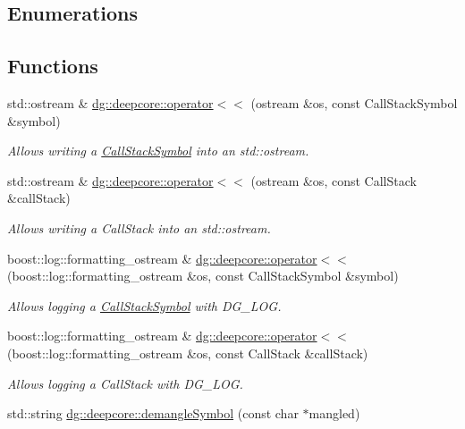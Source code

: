 \subsection*{Enumerations}
\subsection*{Functions}
\begin{DoxyCompactItemize}
\item 
std\+::ostream \& \hyperlink{group___utility_module_gafa131d4872913d78dd09474524e54de3}{dg\+::deepcore\+::operator$<$$<$} (ostream \&os, const Call\+Stack\+Symbol \&symbol)
\begin{DoxyCompactList}\small\item\em Allows writing a \hyperlink{structdg_1_1deepcore_1_1_call_stack_symbol}{Call\+Stack\+Symbol} into an std\+::ostream. \end{DoxyCompactList}\item 
std\+::ostream \& \hyperlink{group___utility_module_ga0e3995beecca99ed6a56bbd006d778cf}{dg\+::deepcore\+::operator$<$$<$} (ostream \&os, const Call\+Stack \&call\+Stack)
\begin{DoxyCompactList}\small\item\em Allows writing a Call\+Stack into an std\+::ostream. \end{DoxyCompactList}\item 
boost\+::log\+::formatting\+\_\+ostream \& \hyperlink{group___utility_module_ga97adfcc9f917f8bd42421eaa2d618ef6}{dg\+::deepcore\+::operator$<$$<$} (boost\+::log\+::formatting\+\_\+ostream \&os, const Call\+Stack\+Symbol \&symbol)
\begin{DoxyCompactList}\small\item\em Allows logging a \hyperlink{structdg_1_1deepcore_1_1_call_stack_symbol}{Call\+Stack\+Symbol} with D\+G\+\_\+\+L\+OG. \end{DoxyCompactList}\item 
boost\+::log\+::formatting\+\_\+ostream \& \hyperlink{group___utility_module_ga34296a075c256c17fe8ba2f1f6d18372}{dg\+::deepcore\+::operator$<$$<$} (boost\+::log\+::formatting\+\_\+ostream \&os, const Call\+Stack \&call\+Stack)
\begin{DoxyCompactList}\small\item\em Allows logging a Call\+Stack with D\+G\+\_\+\+L\+OG. \end{DoxyCompactList}\item 
std\+::string \hyperlink{group___utility_module_ga2e2dd1419bf0d4fd4b2b6db7432a5127}{dg\+::deepcore\+::demangle\+Symbol} (const char $\ast$mangled)

\end{DoxyCompactItemize}
